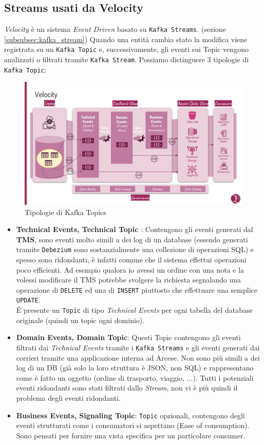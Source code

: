 \subsection{Streams usati da Velocity}
\label{sec:velocity_streams}
\textit{Velocity} è un sistema \textit{Event Driven} basato su \texttt{Kafka Streams}. (sezione \ref{subsubsec:kafka_stream})
Quando una entità cambia stato la modifica viene registrata su un \texttt{Kafka Topic} e, successivamente, gli eventi sui Topic vengono analizzati o filtrati tramite \texttt{Kafka Stream}.
Possiamo distinguere 3 tipologie di \texttt{Kafka Topic}:
\begin{figure}[H]
    \centering
    \includegraphics[scale=0.5]{images/architecture/confluent_velocity.jpg}
    \caption{Tipologie di Kafka Topics}
    \label{fig:kafka_topics.img}
\end{figure}
\begin{itemize}
    \item \textbf{Technical Events, Technical Topic }: Contengono gli eventi generati dal \textbf{TMS}, sono eventi molto simili a dei log di un database
    (essendo generati tramite \texttt{Debezium} sono sostanzialmente una collezione di operazioni SQL) e spesso sono ridondanti, è
    infatti comune che il sistema effettui operazioni poco efficienti.
    Ad esempio qualora io avessi un ordine con una nota e la volessi modificare il TMS potrebbe svolgere la richiesta segnalando una operazione di \texttt{DELETE} ed una di \texttt{INSERT} piuttosto che effettuare una semplice \texttt{UPDATE}.\\
    É presente un \texttt{Topic} di tipo \textit{Technical Events} per ogni tabella del database originale (quindi un topic ogni dominio).
    \item \textbf{Domain Events, Domain Topic}: Questi Topic contengono gli eventi filtrati dai \textit{Technical Events} tramite i \texttt{Kafka Streams} 
    e gli eventi generati dai corrieri tramite una applicazione interna ad Arcese.
    Non sono più simili a dei log di un DB (già solo la loro struttura è JSON, non SQL) e rappresentano come è fatto un oggetto (ordine di trasporto, viaggio, ...). 
    Tutti i potenziali eventi ridondanti sono stati filtrati dallo \textit{Stream}, non vi è più quindi il problema degli eventi ridondanti.
    \item \textbf{Business Events, Signaling Topic}: \texttt{Topic} opzionali, contengono degli eventi strutturati come i consumatori si aspettano (Ease of consumption).
    Sono pensati per fornire una vista specifica per un particolare consumer.
\end{itemize}
